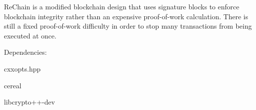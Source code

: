 Re\+Chain is a modified blockchain design that uses signature blocks to enforce blockchain integrity rather than an expensive proof-\/of-\/work calculation. There is still a fixed proof-\/of-\/work difficulty in order to stop many transactions from being executed at once.

Dependencies\+:
\begin{DoxyItemize}
\item cxxopts.\+hpp
\item cereal
\item libcrypto++-\/dev 
\end{DoxyItemize}